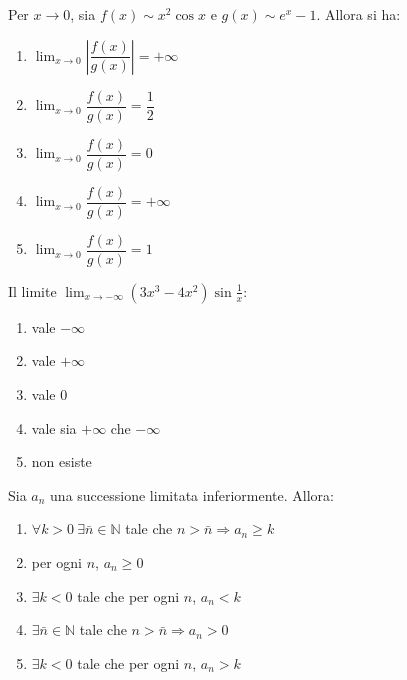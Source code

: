 \begin{quiz}
Per $x\to0$, sia $f(x)\sim x^2\cos x$ e $g(x)\sim e^x-1$. Allora si ha:
\begin{enumerate}
\item $\lim_{x\to0}\left|\dfrac{f(x)}{g(x)}\right|=+\infty$
\item $\lim_{x\to0}\dfrac{f(x)}{g(x)}=\dfrac12$
\item $\lim_{x\to0}\dfrac{f(x)}{g(x)}=0$
\item $\lim_{x\to0}\dfrac{f(x)}{g(x)}=+\infty$
\item $\lim_{x\to0}\dfrac{f(x)}{g(x)}=1$
\end{enumerate}
\end{quiz}

\begin{quiz}
Il limite $\displaystyle\lim_{x\to-\infty}(3x^3-4x^2)\sin\frac1x$:
\begin{enumerate}
\item vale $-\infty$
\item vale $+\infty$
\item vale $0$
\item vale sia $+\infty$ che $-\infty$
\item non esiste
\end{enumerate}
\end{quiz}

\begin{quiz}
Sia $a_n$ una successione limitata inferiormente. Allora:
\begin{enumerate}
\item $\forall k>0\ \exists\bar n\in\mathbb N$ tale che $n>\bar n\Rightarrow a_n\ge k$
\item per ogni $n$, $a_n\ge0$
\item $\exists k<0$ tale che per ogni $n$, $a_n<k$
\item $\exists\bar n\in\mathbb N$ tale che $n>\bar n\Rightarrow a_n>0$
\item $\exists k<0$ tale che per ogni $n$, $a_n>k$
\end{enumerate}
\end{quiz}

